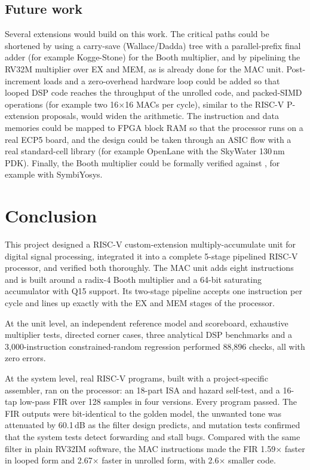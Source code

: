 \section{Future work}
Several extensions would build on this work. The critical paths could be
shortened by using a carry-save (Wallace/Dadda) tree with a parallel-prefix
final adder (for example Kogge-Stone) for the Booth multiplier, and by
pipelining the RV32M multiplier over EX and MEM, as is already done for the MAC
unit. Post-increment loads and a zero-overhead hardware loop could be added so
that looped DSP code reaches the throughput of the unrolled code, and
packed-SIMD operations (for example two 16$\times$16 MACs per cycle), similar
to the RISC-V P-extension proposals, would widen the arithmetic. The
instruction and data memories could be mapped to FPGA block RAM so that the
processor runs on a real ECP5 board, and the design could be taken through an
ASIC flow with a real standard-cell library (for example OpenLane with the
SkyWater 130\,nm PDK). Finally, the Booth multiplier could be formally verified
against \code{*}, for example with SymbiYosys.

\chapter{Conclusion}\label{ch:concl}
This project designed a RISC-V custom-extension multiply-accumulate unit for
digital signal processing, integrated it into a complete 5-stage pipelined
RISC-V processor, and verified both thoroughly. The MAC unit adds eight
 instructions and is built around a radix-4 Booth multiplier
and a 64-bit saturating accumulator with Q15 support. Its two-stage pipeline
accepts one instruction per cycle and lines up exactly with the EX and MEM
stages of the processor.

At the unit level, an independent reference model and scoreboard, exhaustive
multiplier tests, directed corner cases, three analytical DSP benchmarks and a
3{,}000-instruction constrained-random regression performed 88{,}896 checks,
all with zero errors.

At the system level, real RISC-V programs, built with a project-specific
assembler, ran on the processor: an 18-part ISA and hazard self-test, and a
16-tap low-pass FIR over 128 samples in four versions. Every program passed.
The FIR outputs were bit-identical to the golden model, the unwanted tone was
attenuated by 60.1\,dB as the filter design predicts, and mutation tests
confirmed that the system tests detect forwarding and stall bugs. Compared with
the same filter in plain RV32IM software, the MAC instructions made the FIR
1.59$\times$ faster in looped form and 2.67$\times$ faster in unrolled form,
with 2.6$\times$ smaller code.

